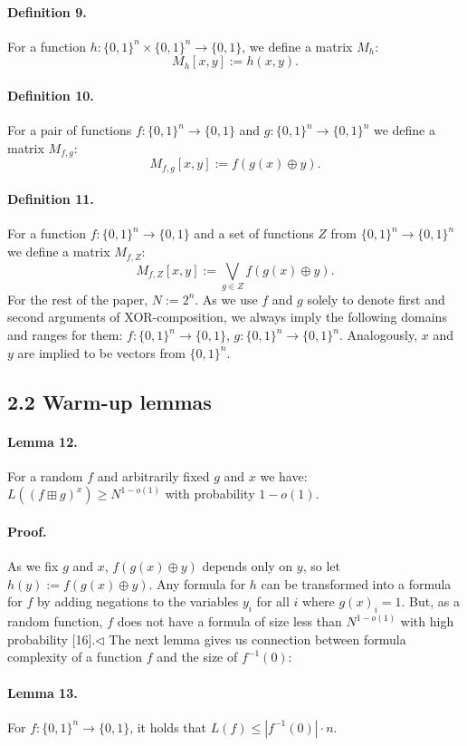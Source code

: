 \documentclass[10pt,a4paper]{article}
\begin{document}
\paragraph{Definition 9.} For a function $h:\{0,1\}^n\times\{0,1\}^n\to\{0,1\}$, we define a matrix $M_h$:
\[M_h[x,y]:=h(x,y).\]
\paragraph{Definition 10.} For a pair of functions $f:\{0,1\}^n\to\{0,1\}$ and $g:\{0,1\}^n\to\{0,1\}^n$ we define a matrix $M_{f,g}$:
\[M_{f,g}[x,y]:=f(g(x)\oplus y).\]
\paragraph{Definition 11.} For a function $f:\{0,1\}^n\to\{0,1\}$ and a set of functions $Z$ from $\{0,1\}^n\to\{0,1\}^n$ we define a matrix $M_{f,Z}$:
\[M_{f,Z}[x,y]:=\bigvee_{g\in Z}f(g(x)\oplus y).\]
For the rest of the paper, $N:=2^n$.
As we use $f$ and $g$ solely to denote first and second arguments of XOR-composition, we always imply the following domains and ranges for them: $f:\{0,1\}^n\to\{0,1\}$, $g:\{0,1\}^n\to\{0,1\}^n$. Analogously, $x$ and $y$ are implied to be vectors from $\{0,1\}^n$.
\subsection*{2.2 Warm-up lemmas}
\paragraph{Lemma 12.} For a random $f$ and arbitrarily fixed $g$ and $x$ we have: $L((f\boxplus g)^x)\geq N^{1-o(1)}$ with probability $1-o(1)$.
\paragraph{Proof.} As we fix $g$ and $x$, $f(g(x)\oplus y)$ depends only on $y$, so let $h(y):=f(g(x)\oplus y)$.
Any formula for $h$ can be transformed into a formula for $f$ by adding negations to the variables $y_i$ for all $i$ where $g(x)_i=1$. But, as a random function, $f$ does not have a formula of size less than $N^{1-o(1)}$ with high probability [16].\hfill$\triangleleft$
The next lemma gives us connection between formula complexity of a function $f$ and the size of $f^{-1}(0)$:
\paragraph{Lemma 13.} For $f:\{0,1\}^n\to\{0,1\}$, it holds that $L(f)\leq|f^{-1}(0)|\cdot n$.
\end{document}
